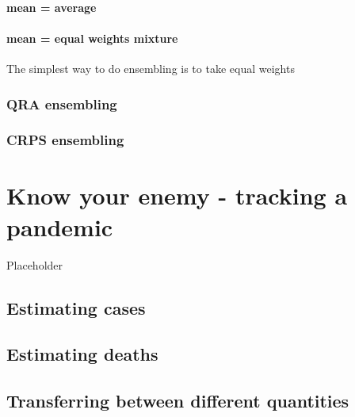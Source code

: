 \documentclass[
]{book}
\begin{document}
\hypertarget{mean-average}{%
\subsubsection{mean = average}\label{mean-average}}

\hypertarget{mean-equal-weights-mixture}{%
\subsubsection{mean = equal weights mixture}\label{mean-equal-weights-mixture}}

The simplest way to do ensembling is to take equal weights

\hypertarget{qra-ensembling}{%
\subsection{QRA ensembling}\label{qra-ensembling}}

\hypertarget{crps-ensembling}{%
\subsection{CRPS ensembling}\label{crps-ensembling}}

\hypertarget{know-your-enemy---tracking-a-pandemic}{%
\chapter{Know your enemy - tracking a pandemic}\label{know-your-enemy---tracking-a-pandemic}}

Placeholder

\hypertarget{estimating-cases}{%
\section{Estimating cases}\label{estimating-cases}}

\hypertarget{estimating-deaths}{%
\section{Estimating deaths}\label{estimating-deaths}}

\hypertarget{transferring-between-different-quantities}{%
\section{Transferring between different quantities}\label{transferring-between-different-quantities}}
\end{document}
